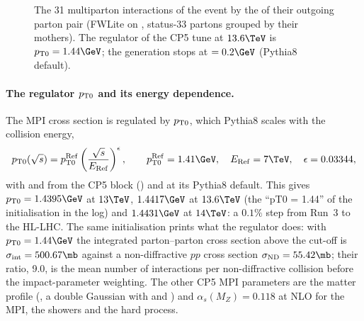 \begin{figure}[htb]
\centering
{}
\caption{The 31 multiparton interactions of the event by the \pt{} of their outgoing parton pair (FWLite on
, status-33 partons grouped by their mothers). The regulator of the CP5 tune at
$13.6\TeV$ is $\ptz=1.44\GeV$; the generation stops at  $=0.2\GeV$
(Pythia8 default).}
\label{fig:04_mpipt}
\end{figure}

\paragraph{The regulator $p_{\mathrm{T}0}$ and its energy dependence.}
The MPI cross section is regulated by $p_{\mathrm{T}0}$, which Pythia8 scales with the collision energy,
\[
\ptz(\sqrt s)=\ptz^{\mathrm{Ref}}\left(\frac{\sqrt s}{E_{\mathrm{Ref}}}\right)^{\epsilon},
\qquad
\ptz^{\mathrm{Ref}}=1.41\GeV,\quad E_{\mathrm{Ref}}=7\TeV,\quad \epsilon=0.03344 ,
\]
with  and  from the CP5 block
() and  at its Pythia8
default. This gives $\ptz=1.4395\GeV$ at $13\TeV$, $1.4417\GeV$ at $13.6\TeV$ (the ``pT0 = 1.44'' of the
initialisation in the log) and $1.4431\GeV$ at $14\TeV$: a $0.1\%$ step from Run~3 to the HL-LHC. The same
initialisation prints what the regulator does: with $\ptz=1.44\GeV$ the integrated parton--parton cross section
above the cut-off is $\sigma_{\mathrm{int}}=500.67\mb$ against a non-diffractive $pp$ cross section
$\sigma_{\mathrm{ND}}=55.42\mb$; their ratio, 9.0, is the mean number of interactions per non-diffractive
collision before the impact-parameter weighting. The other CP5 MPI parameters are the matter profile
(, a double Gaussian with  and ) and
$\alpha_s(M_Z)=0.118$ at NLO for the MPI, the showers and the hard process.

